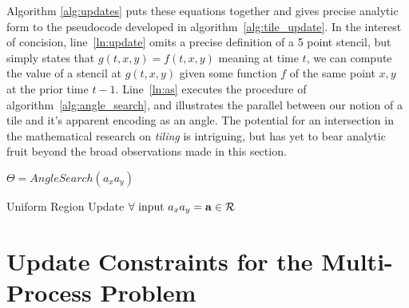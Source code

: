 Algorithm \ref{alg:updates}
puts these equations together and gives precise analytic form to
the pseudocode developed in algorithm~\ref{alg:tile_update}.
In the interest of concision, line~\ref{ln:update} omits a precise definition of a 5
point stencil, but simply states that $g(t,x,y) = f(t,x,y)$ meaning at time
$t$, we can compute the value of a stencil at $g(t,x,y)$ given some function $f$
of the same point $x,y$ at the prior time $t-1$.
Line~\ref{ln:as} executes the procedure of algorithm~\ref{alg:angle_search},
and illustrates the parallel between our notion of a tile and
it's apparent encoding as an angle.  The potential for
an intersection in the mathematical research on {\it tiling} is
intriguing, but has yet to bear analytic fruit beyond the broad
observations made in this section.
\begin{algorithm}[h]
  \setcounter{AlgoLine}{0}
  $\Theta = AngleSearch(a_xa_y)$\; \label{ln:as}

  \caption{Uniform Region Update $\forall \text{ input } a_xa_y = \mathbf{a} \in \mathcal{R}$}
  \label{alg:updates}
\end{algorithm}

\section{Update Constraints for the Multi-Process Problem}

